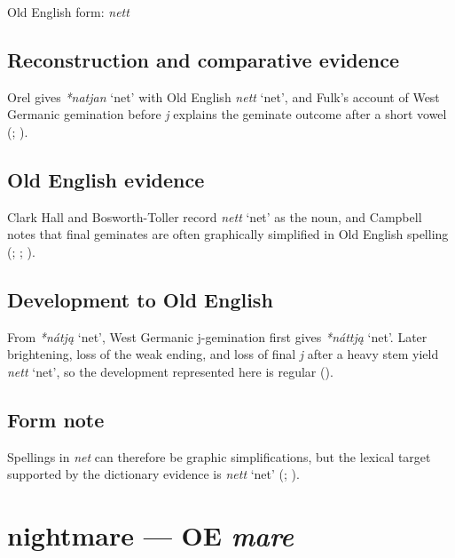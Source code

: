 \documentclass[
  british,
  a4paper,
  openany]{book}
\providecommand{\Recon}[1]{\emph{*#1}}
{\catcode`→=\active \global\def→{\ensuremath{\rightarrow}}}
\providecommand{\texorpdfstring}[2]{#1}
\providecommand{\Recon}[1]{\emph{*#1}}
{\catcode`→=\active \global\def→{\ensuremath{\rightarrow}}}
\begin{document}
Old English form: \emph{nett}

\subsection{Reconstruction and comparative
evidence}\label{reconstruction-and-comparative-evidence-40}

Orel gives \Recon{natjan} `net' with Old English {\emph{nett}} `net',
and Fulk's account of West Germanic gemination before \emph{j} explains
the geminate outcome after a short vowel (; ).

\subsection{Old English evidence}\label{old-english-evidence-40}

Clark Hall and Bosworth-Toller record {\emph{nett}} `net' as the noun,
and Campbell notes that final geminates are often graphically simplified
in Old English spelling (;
;
).

\subsection{Development to Old
English}\label{development-to-old-english-40}

From \Recon{nátją} `net', West Germanic j-gemination first gives
\Recon{náttją} `net'. Later brightening, loss of the weak ending, and
loss of final \emph{j} after a heavy stem yield {\emph{nett}} `net', so
the development represented here is regular
().

\subsection{Form note}\label{form-note-13}

Spellings in \emph{net} can therefore be graphic simplifications, but
the lexical target supported by the dictionary evidence is {\emph{nett}}
`net' (;
).

\section{\texorpdfstring{nightmare --- OE
\emph{mare}}{nightmare --- OE mare}}\label{nightmare-oe-mare}
\end{document}
